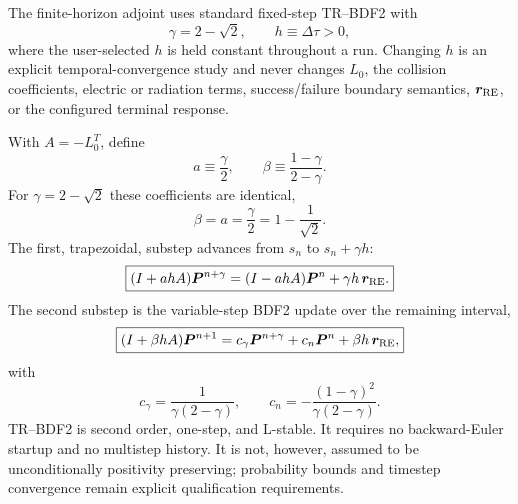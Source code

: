 \documentclass[11pt]{article}
\begin{document}
The finite-horizon adjoint uses standard fixed-step TR--BDF2 with
\begin{equation}
 \gamma=2-\sqrt{2},
 \qquad
 h\equiv\Delta\tau>0,
 \label{eq:time_rpf_fixed_dt}
\end{equation}
where the user-selected $h$ is held constant throughout a run.  Changing $h$ is an explicit
temporal-convergence study and never changes $L_0$, the collision coefficients, electric or
radiation terms, success/failure boundary semantics, $\bm r_{\rm RE}$, or the configured
terminal response.

With $A=-L_0^T$, define
\begin{equation}
 a\equiv\frac{\gamma}{2},
 \qquad
 \beta\equiv\frac{1-\gamma}{2-\gamma}.
 \label{eq:time_rpf_tr_ab}
\end{equation}
For $\gamma=2-\sqrt2$ these coefficients are identical,
\begin{equation}
 \boxed{\beta=a=\frac{\gamma}{2}=1-\frac{1}{\sqrt2}.}
 \label{eq:time_rpf_tr_shared_coeff}
\end{equation}
The first, trapezoidal, substep advances from $s_n$ to $s_n+\gamma h$:
\begin{equation}
 \boxed{
 (I+a h A)\bm P^{n+\gamma}
 =(I-a h A)\bm P^n+\gamma h\,\bm r_{\rm RE}.
 }
 \label{eq:time_rpf_tr_stage1}
\end{equation}
The second substep is the variable-step BDF2 update over the remaining interval,
\begin{equation}
 \boxed{
 (I+\beta h A)\bm P^{n+1}
 =c_\gamma\bm P^{n+\gamma}+c_n\bm P^n
 +\beta h\,\bm r_{\rm RE},
 }
 \label{eq:time_rpf_tr_stage2}
\end{equation}
with
\begin{equation}
 c_\gamma=\frac{1}{\gamma(2-\gamma)},
 \qquad
 c_n=-\frac{(1-\gamma)^2}{\gamma(2-\gamma)}.
 \label{eq:time_rpf_tr_coeffs}
\end{equation}
TR--BDF2 is second order, one-step, and L-stable.  It requires no backward-Euler startup and
no multistep history.  It is not, however, assumed to be unconditionally positivity preserving;
probability bounds and timestep convergence remain explicit qualification requirements.
\end{document}
